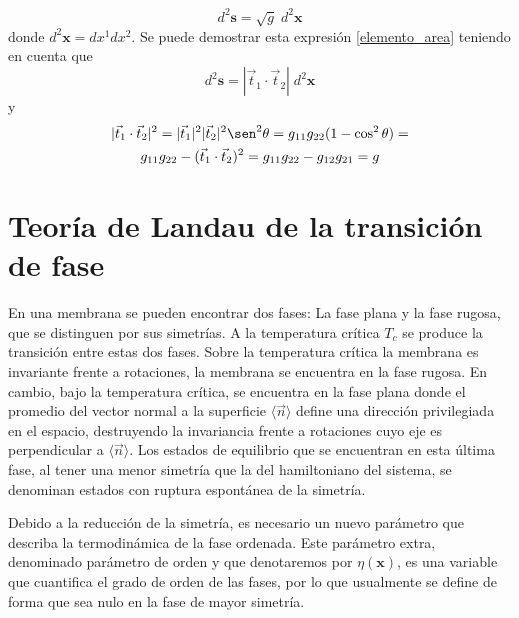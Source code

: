 \begin{equation}\label{elemento_area}
d^2\mathbf{s}=\sqrt{g}\;d^2\mathbf{x}
\end{equation}
donde $d^2\mathbf{x}=dx^1dx^2$. Se puede demostrar esta expresión
\eqref{elemento_area} teniendo en cuenta que
\begin{equation*}
d^2\mathbf{s}=|\vec{t}_1\cdot\vec{t}_2|\;d^2\mathbf{x}
\end{equation*}
y
\begin{multline*}
|\vec{t}_1\cdot\vec{t}_2|^2=|\vec{t}_1|^2|\vec{t}_2|^2\sen^2
\theta=g_{11}g_{22}(1-\cos^2 \theta)=\\
g_{11}g_{22}-(\vec{t}_1\cdot\vec{t}_2)^2=g_{11}g_{22}-g_{12}g_{21}=g
\end{multline*}

\section{Teoría de Landau de la transición de fase}

En una membrana se pueden encontrar dos fases: La fase plana y la fase
rugosa, que se distinguen por sus simetrías. A la temperatura crítica $T_c$ se
produce la transición entre estas dos fases. Sobre la temperatura crítica la
membrana es invariante frente a rotaciones, 
la membrana se encuentra en la fase rugosa. En cambio, bajo la temperatura
crítica, se encuentra en la fase plana donde el promedio del vector normal a
la superficie $\langle \vec{n}\rangle$ define una dirección privilegiada en el
espacio, destruyendo la invariancia frente a rotaciones cuyo eje es
perpendicular a $\langle \vec{n}\rangle$. Los estados de equilibrio que se
encuentran en esta última fase, al tener una menor simetría que la del
hamiltoniano del sistema, se denominan estados con ruptura espontánea de la
simetría. 
 
Debido a la reducción de la simetría, es necesario un nuevo parámetro que 
describa la termodinámica de la fase ordenada. Este parámetro
extra, denominado parámetro de orden y que denotaremos por $\eta(\mathbf{x})$,
es una 
variable que cuantifica el grado de orden de
las fases, por lo que usualmente se define de forma que sea nulo en la fase
de mayor simetría.

\begin{figure}[h]
\centering
{}
\quad
{}
\end{figure}

